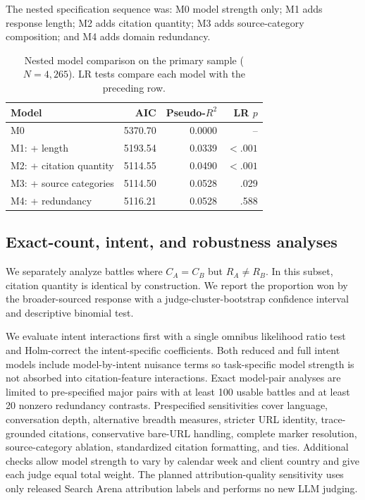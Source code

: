 \documentclass[sigconf,natbib=true,anonymous=true]{acmart}
\begin{document}
The nested specification sequence was: M0 model strength only; M1 adds response length; M2 adds citation quantity; M3 adds source-category composition; and M4 adds domain redundancy.

\begin{table}[t]
\centering
\caption{Nested model comparison on the primary sample ($N=4{,}265$). LR tests compare each model with the preceding row.}
\label{tab:nested}
\small
\begin{tabular}{lrrr}
\toprule
Model & AIC & Pseudo-$R^2$ & LR $p$ \\
\midrule
M0 & 5370.70 & 0.0000 & -- \\
M1: + length & 5193.54 & 0.0339 & $<.001$ \\
M2: + citation quantity & 5114.55 & 0.0490 & $<.001$ \\
M3: + source categories & 5114.50 & 0.0528 & .029 \\
M4: + redundancy & 5116.21 & 0.0528 & .588 \\
\bottomrule
\end{tabular}
\end{table}

\subsection{Exact-count, intent, and robustness analyses}
We separately analyze battles where $C_A=C_B$ but $R_A\ne R_B$. In this subset, citation quantity is identical by construction. We report the proportion won by the broader-sourced response with a judge-cluster-bootstrap confidence interval and descriptive binomial test.

We evaluate intent interactions first with a single omnibus likelihood ratio test and Holm-correct the intent-specific coefficients. Both reduced and full intent models include model-by-intent nuisance terms so task-specific model strength is not absorbed into citation-feature interactions. Exact model-pair analyses are limited to pre-specified major pairs with at least 100 usable battles and at least 20 nonzero redundancy contrasts. Prespecified sensitivities cover language, conversation depth, alternative breadth measures, stricter URL identity, trace-grounded citations, conservative bare-URL handling, complete marker resolution, source-category ablation, standardized citation formatting, and ties. Additional checks allow model strength to vary by calendar week and client country and give each judge equal total weight. The planned attribution-quality sensitivity uses only released Search Arena attribution labels and performs no new LLM judging.
\end{document}
